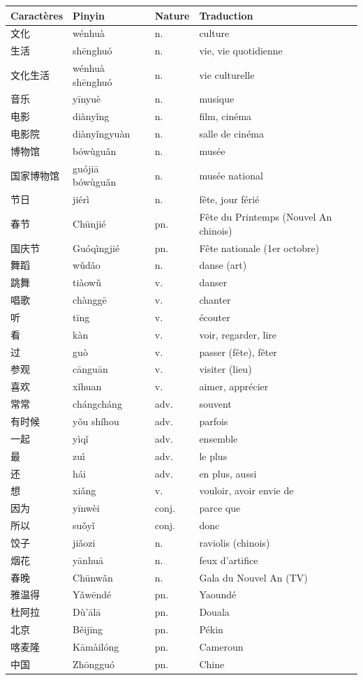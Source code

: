 \documentclass[11pt]{article}
\begin{document}
\begin{center}
\begin{tabularx}{\linewidth}{|X|X|X|X|}
\hline
\rowcolor{popblueL} \textbf{Caractères} & \textbf{Pinyin} & \textbf{Nature} & \textbf{Traduction} \\
\hline
文化 & wénhuà & n. & culture \\
生活 & shēnghuó & n. & vie, vie quotidienne \\
文化生活 & wénhuà shēnghuó & n. & vie culturelle \\
音乐 & yīnyuè & n. & musique \\
电影 & diànyǐng & n. & film, cinéma \\
电影院 & diànyǐngyuàn & n. & salle de cinéma \\
博物馆 & bówùguǎn & n. & musée \\
国家博物馆 & guójiā bówùguǎn & n. & musée national \\
节日 & jiérì & n. & fête, jour férié \\
春节 & Chūnjié & pn. & Fête du Printemps (Nouvel An chinois) \\
国庆节 & Guóqìngjié & pn. & Fête nationale (1er octobre) \\
舞蹈 & wǔdǎo & n. & danse (art) \\
跳舞 & tiàowǔ & v. & danser \\
唱歌 & chànggē & v. & chanter \\
听 & tīng & v. & écouter \\
看 & kàn & v. & voir, regarder, lire \\
过 & guò & v. & passer (fête), fêter \\
参观 & cānguān & v. & visiter (lieu) \\
喜欢 & xǐhuan & v. & aimer, apprécier \\
常常 & chángcháng & adv. & souvent \\
有时候 & yǒu shíhou & adv. & parfois \\
一起 & yìqǐ & adv. & ensemble \\
最 & zuì & adv. & le plus \\
还 & hái & adv. & en plus, aussi \\
想 & xiǎng & v. & vouloir, avoir envie de \\
因为 & yīnwèi & conj. & parce que \\
所以 & suǒyǐ & conj. & donc \\
饺子 & jiǎozi & n. & raviolis (chinois) \\
烟花 & yānhuā & n. & feux d'artifice \\
春晚 & Chūnwǎn & n. & Gala du Nouvel An (TV) \\
雅温得 & Yǎwēndé & pn. & Yaoundé \\
杜阿拉 & Dù'ālā & pn. & Douala \\
北京 & Běijīng & pn. & Pékin \\
喀麦隆 & Kāmàilóng & pn. & Cameroun \\
中国 & Zhōngguó & pn. & Chine \\
\hline
\end{tabularx}
\end{center}
\end{document}
